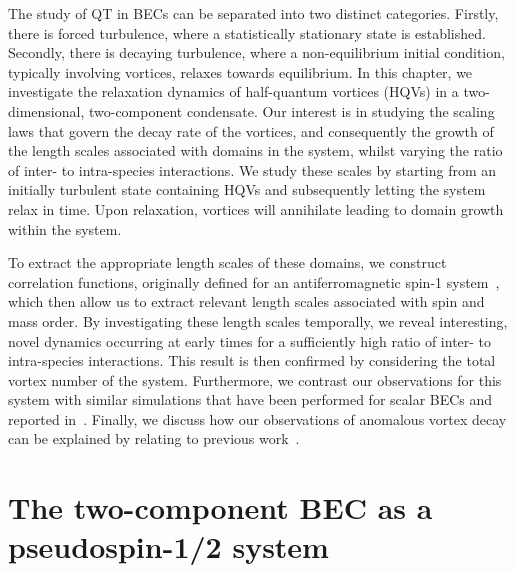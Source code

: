 The study of QT in BECs can be separated into two distinct categories.
Firstly, there is forced turbulence, where a statistically stationary state is
established.
Secondly, there is decaying turbulence, where a non-equilibrium initial
condition, typically involving vortices, relaxes towards equilibrium.
In this chapter, we investigate the relaxation dynamics of half-quantum vortices
(HQVs) in a two-dimensional, two-component condensate.
Our interest is in studying the scaling laws that govern the decay rate of the
vortices, and consequently the growth of the length scales associated with
domains in the system, whilst varying the ratio of inter- to intra-species
interactions.
We study these scales by starting from an initially turbulent state containing
HQVs and subsequently letting the system relax in time.
Upon relaxation, vortices will annihilate leading to domain growth within
the system.

To extract the appropriate length scales of these domains, we construct
correlation functions, originally defined for an antiferromagnetic spin-1
system~\cite{Symes2017}, which then allow us to extract relevant length scales
associated with spin and mass order.
By investigating these length scales temporally, we reveal interesting,
novel dynamics occurring at early times for a sufficiently high ratio of
inter- to intra-species interactions.
This result is then confirmed by considering the total vortex number of the
system.
Furthermore, we contrast our observations for this system with similar
simulations that have been performed for scalar BECs and reported
in~\cite{Schole2012, Nowak2012, Karl2017}.
Finally, we discuss how our observations of anomalous vortex decay can be
explained by relating to previous work~\cite{Eto2011, Kasamatsu2016}.

\section{The two-component BEC as a pseudospin-1/2 system}
